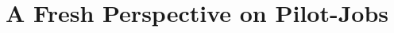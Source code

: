 \documentclass{sig-alternate}
\begin{document}

\title{A Fresh Perspective on Pilot-Jobs}

\end{document}
